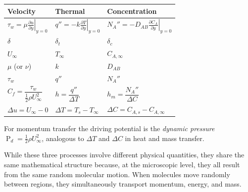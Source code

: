 \begin{table}[H]
    \centering
    \begin{threeparttable}
        \begin{tabular}{m{4cm} m{4cm} m{4cm}}
            \toprule
            \textbf{Velocity} & \textbf{Thermal} & \textbf{Concentration} \\
            \midrule
            $\displaystyle \tau_w = \mu\left.\frac{\partial u}{\partial y}\right|_{y=0}$ & $\displaystyle q'' = -k\left.\frac{\partial T}{\partial y}\right|_{y=0}$ & $\displaystyle N_A'' = -D_{AB}\left.\frac{\partial C_A}{\partial y}\right|_{y=0}$ \\
            [1em]
            $\delta$ & $\delta_t$ & $\delta_c$ \\
            [0.5em]
            $U_{\infty}$ & $T_{\infty}$ & $C_{A,\infty}$ \\
            [0.5em]
            $\mu$ (or $\nu$) & $k$ & $D_{AB}$ \\
            [0.5em]
            $\tau_w$ & $q''$ & $N_A''$ \\
            [0.5em]
            $\displaystyle C_f = \dfrac{\tau_w}{\tfrac12 \rho U_{\infty}^{2}}$\tnote{\dag} & $\displaystyle h = \dfrac{q''}{\Delta T}$ & $\displaystyle h_m = \dfrac{N_A''}{\Delta C}$ \\
            [1em]
            $\Delta u = U_{\infty} - 0$ & $\Delta T = T_s - T_{\infty}$ & $\Delta C = C_{A,s} - C_{A,\infty}$ \\
            \bottomrule
        \end{tabular}
        \begin{tablenotes}\footnotesize
            \item[\dag] For momentum transfer the driving potential is the \emph{dynamic pressure} $\operatorname{P}_{d} = \tfrac12 \rho U_{\infty}^{2}$, analogous to $\Delta T$ and $\Delta C$ in heat and mass transfer.
        \end{tablenotes}
    \end{threeparttable}
\end{table}
%
While these three processes involve different physical quantities, they share the same mathematical structure because, at the microscopic level, they all result from the same random molecular motion. When molecules move randomly between regions, they simultaneously transport momentum, energy, and mass.
